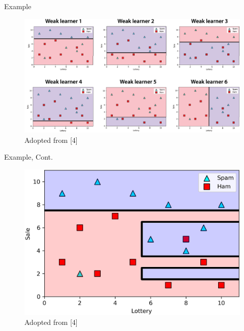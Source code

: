 \documentclass[serif, aspectratio=169]{beamer}
\begin{document}
\begin{frame}{Example}
    \begin{center}
        \begin{figure}
            \includegraphics[width=\linewidth]{pic/adaboost_e11.png}
            {\scriptsize Adopted from [4]}
        \end{figure}
        \endminipage
    \end{center}
\end{frame}

\begin{frame}{Example, Cont.}
    \begin{center}
        \begin{figure}
            \includegraphics[width=\linewidth]{pic/adaboost_e12.png}
            {\scriptsize Adopted from [4]}
        \end{figure}
        \endminipage
    \end{center}
\end{frame}
\end{document}
